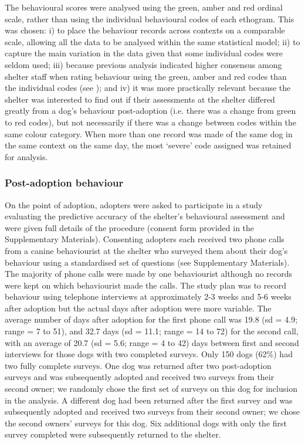 \documentclass[12pt]{article}
\begin{document}
The behavioural scores were analysed using the green, amber and red ordinal scale, rather than using the individual behavioural codes of each ethogram. This was chosen: i) to place the behaviour records across contexts on a comparable scale, allowing all the data to be analysed within the same statistical model; ii) to capture the main variation in the data given that some individual codes were seldom used; iii) because previous analysis indicated higher consensus among shelter staff when rating behaviour using the green, amber and red codes than the individual codes (see \cite{goold2017modelling}); and iv) it was more practically relevant because the shelter was interested to find out if their assessments at the shelter differed greatly from a dog's behaviour post-adoption (i.e. there was a change from green to red codes), but not necessarily if there was a change between codes within the same colour category. When more than one record was made of the same dog in the same context on the same day, the most `severe' code assigned was retained for analysis.

\subsubsection{Post-adoption behaviour}
On the point of adoption, adopters were asked to participate in a study evaluating the predictive accuracy of the shelter's behavioural assessment and were given full details of the procedure (consent form provided in the Supplementary Materials). Consenting adopters each received two phone calls from a canine behaviourist at the shelter who surveyed them about their dog's behaviour using a standardised set of questions (see Supplementary Materials). The majority of phone calls were made by one behaviourist although no records were kept on which behaviourist made the calls. The study plan was to record behaviour using telephone interviews at approximately 2-3 weeks and 5-6 weeks after adoption but the actual days after adoption were more variable. The average number of days after adoption for the first phone call was 19.8 (sd = 4.9; range = 7 to 51), and 32.7 days (sd = 11.1; range = 14 to 72) for the second call, with an average of 20.7 (sd = 5.6; range = 4 to 42) days between first and second interviews for those dogs with two completed surveys. Only 150 dogs (62\%) had two fully complete surveys. One dog was returned after two post-adoption surveys and was subsequently adopted and received two surveys from their second owner; we randomly chose the first set of surveys on this dog for inclusion in the analysis. A different dog had been returned after the first survey and was subsequently adopted and received two surveys from their second owner; we chose the second owners' surveys for this dog. Six additional dogs with only the first survey completed were subsequently returned to the shelter.
\end{document}
